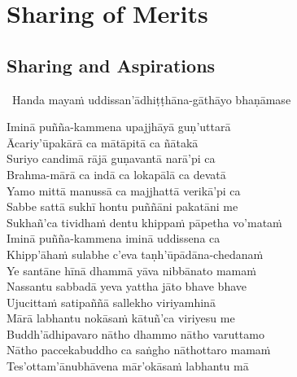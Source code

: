 
\ifdigitalversion
\else
\fi

\chapter{Sharing of Merits}



\begingroup
\setsechook{%
  \clearpage%
  \setsecnumformat{}%
}

\setsecheadstyle{\sectionFmt}

\section{Sharing and Aspirations}
\label{uddissanadhitthana}

\begin{leader}
  \anglebracketleft\ \hspace{-0.5mm}Handa mayaṁ uddissan'ādhiṭṭhāna-gāthāyo \mbox{bhaṇāmase}~\hspace{-0.5mm}\anglebracketright\
\end{leader}

Iminā puñña-kammena upajjhāyā guṇ'uttarā\\
Ācariy'ūpakārā ca mātāpitā ca ñātakā\\
Suriyo candimā rājā guṇavantā narā'pi ca\\
Brahma-mārā ca indā ca lokapālā ca devatā\\
Yamo mittā manussā ca majjhattā verikā'pi ca\\
Sabbe sattā sukhī hontu puññāni pakatāni me\\
Sukhañ'ca tividhaṁ dentu khippaṁ pāpetha vo'mataṁ\\
Iminā puñña-kammena iminā uddissena ca\\
Khipp'āhaṁ sulabhe c'eva taṇh'ūpādāna-chedanaṁ\\
Ye santāne hīnā dhammā yāva nibbānato mamaṁ\\
Nassantu sabbadā yeva yattha jāto bhave bhave\\
Ujucittaṁ satipaññā sallekho viriyamhinā\\
Mārā labhantu nokāsaṁ kātuñ'ca viriyesu me\\
Buddh'ādhipavaro nātho dhammo nātho varuttamo\\
Nātho paccekabuddho ca saṅgho nāthottaro mamaṁ\\
Tes'ottam'ānubhāvena mār'okāsaṁ labhantu mā

